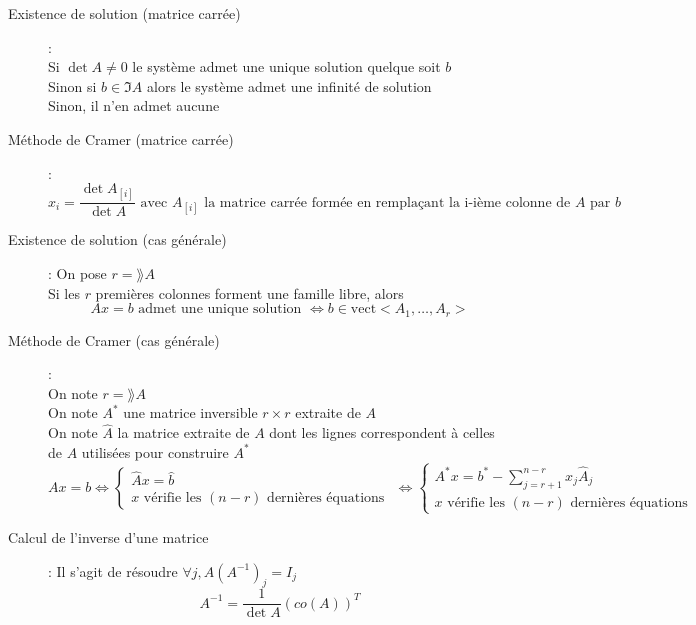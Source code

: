 \begin{description}
\item[Existence de solution (matrice carrée)] : \\
    Si $\det A\ne 0$ le système admet une unique solution quelque soit $b$\\
    Sinon si $b\in \Im A$ alors le système admet une infinité de solution\\
    Sinon, il n'en admet aucune
\item[Méthode de Cramer (matrice carrée)] : 
    \[
        x_i=\dfrac{\det A_{[i]}}{\det A} \textrm{ avec } A_{[i]}
        \textrm{ la matrice carrée formée en remplaçant la i-ième colonne de } A
        \textrm{ par } b
    \]
\item[Existence de solution (cas générale)] : On pose $r=\rang A$\\
Si les $r$ premières colonnes forment une famille libre, alors
    \[
        Ax=b\textrm{ admet une unique solution }\Leftrightarrow
        b\in\textrm{vect}<A_1,\dots,A_r>
    \]
\item[Méthode de Cramer (cas générale)] : \\
    On note $r=\rang A$\\
    On note $A^*$ une matrice inversible $r\times r$ extraite de $A$\\
    On note $\hat A$ la matrice extraite de $A$ dont les lignes correspondent à celles de $A$ utilisées pour construire $A^*$
    \[
        Ax=b\Leftrightarrow
        \begin{cases}
            \hat Ax=\hat b\\
            x\textrm{ vérifie les } (n-r) \textrm{ dernières équations }
        \end{cases}
        \Leftrightarrow
        \begin{cases}
            A^*x=b^*-\sum_{j=r+1}^{n-r}x_j\hat A_j\\
            x\textrm{ vérifie les } (n-r) \textrm{ dernières équations }
        \end{cases}
    \]
\item[Calcul de l'inverse d'une matrice] : Il s'agit de résoudre $\forall j, A(A^{-1})_j=I_j$
    \[ A^{-1}=\dfrac{1}{\det A}(co(A))^T \]
\end{description}
